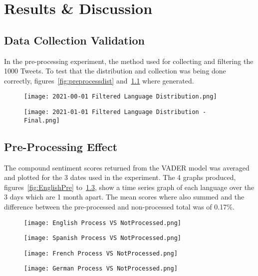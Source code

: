\chapter{Results \& Discussion}

\section{Data Collection Validation}

In the pre-processing experiment, the method used for collecting and filtering the 1000 Tweets.
To test that the distribution and collection was being done correctly, figures~\ref{fig:preprocessdist} and~\ref{fig:finaldist} where generated.


\begin{figure}[!htb]
  \texttt{[image: 2021-00-01 Filtered Language Distribution.png]}
  \caption[Pre-Process Filtered Language Distribution]{ }
  \label{fig:preprocessdist}
\endminipage\hfill
{}
  \texttt{[image: 2021-01-01 Filtered Language Distribution - Final.png]}
  \caption[Final Filtered Language Distribution]{ }
  \label{fig:finaldist}
\endminipage
\end{figure}


\section{Pre-Processing Effect}

The compound sentiment scores returned from the \ac{VADER} model was averaged and plotted for the 3 dates used in the experiment.
The 4 graphs produced, figures~\ref{fig:EnglishPre} to~\ref{fig:GermanPre}, show a time series graph of each language over the 3 days which are 1 month apart.
The mean scores where also summed and the difference between the pre-processed and non-processed total was of 0.17\%.

\begin{figure}[!htb]
  \texttt{[image: English Process VS NotProcessed.png]}
  \caption[English Process VS NotProcessed]{ }\label{fig:EnglishPre}
\endminipage\hfill
{}
  \texttt{[image: Spanish Process VS NotProcessed.png]}
  \caption[Spanish Process VS NotProcessed]{ }\label{fig:SpanishPre}
\endminipage
\end{figure}
\begin{figure}[!htb]
  \texttt{[image: French Process VS NotProcessed.png]}
  \caption[French Process VS NotProcessed]{ }\label{fig:FrenchPre}
\endminipage\hfill
{}
  \texttt{[image: German Process VS NotProcessed.png]}
  \caption[German Process VS NotProcessed]{ }\label{fig:GermanPre}
\endminipage
\end{figure}

